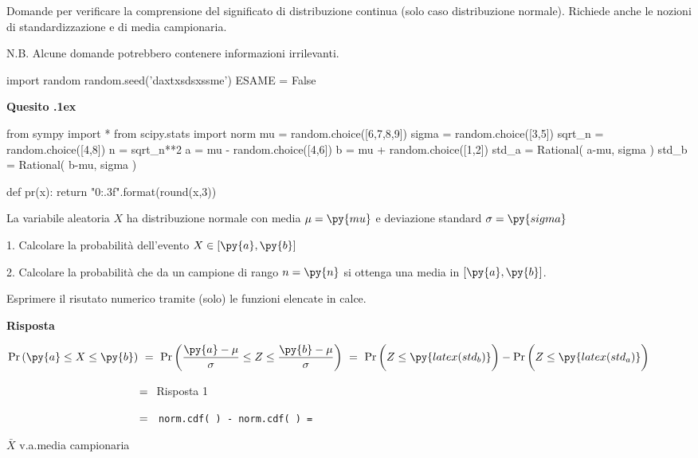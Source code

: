 \documentclass[11pt,twoside,a4paper]{article}
\def\Pr{{\rm Pr\,}}
\newcounter{quesito}
\newenvironment{question}{\addtocounter{quesito}{1}\bigskip\bigskip\par\textbf{Quesito \thequesito.\kern1ex}}{\vspace{\parskip}}
\newenvironment{answer}{\par\textbf{Risposta\quad}}{\vspace{\parskip}}
\begin{document}
\colorbox{blue!10}{\begin{minipage}{\textwidth}
Domande per verificare la comprensione del significato di distribuzione continua (solo caso distribuzione normale). Richiede anche le nozioni di standardizzazione e di media campionaria.\medskip

N.B. Alcune domande potrebbero contenere informazioni irrilevanti.
\end{minipage}}
\bigskip\bigskip


\begin{pycode}
import random
random.seed('daxtxsdsxssme')
ESAME = False
\end{pycode}

\begin{question} %
\begin{pycode}
from sympy import *
from scipy.stats import norm
mu = random.choice([6,7,8,9])
sigma = random.choice([3,5])
sqrt_n = random.choice([4,8])
n = sqrt_n**2
a = mu - random.choice([4,6])
b = mu + random.choice([1,2])
std_a = Rational( a-mu, sigma )
std_b = Rational( b-mu, sigma )

def pr(x):
    return "{0:.3f}".format(round(x,3))
\end{pycode}
La variabile aleatoria $X$ ha distribuzione normale con media $\mu=\py{mu}$ e deviazione standard $\sigma=\py{sigma}$ 

1. Calcolare la probabilità dell'evento $X\in [\py{a},\py{b}]$ 

2. Calcolare la probabilità che da un campione di rango $n=\py{n}$ si ottenga una media in $[\py{a},\py{b}]$. 

Esprimere il risutato numerico tramite (solo) le funzioni elencate in calce.
\begin{answer}


$\displaystyle \Pr(\py{a}\le X\le\py{b})
\ =\ 
\Pr\bigg(\dfrac{\py{a}-\mu}{\sigma}\le Z\le\dfrac{\py{b}-\mu}{\sigma}\bigg)
\ =\  
\Pr\bigg(Z\le\py{latex(std_b)}\bigg) -  \Pr\bigg(Z\le\py{latex(std_a)}\bigg)$ 

$\phantom{\Pr\py{a}\le X\le\py{b})}
\ =\ 
${ 
\hfill Risposta 1}

$\phantom{\Pr\py{a}\le X\le\py{b})}
\ =\ 
${\tt\ norm.cdf(  ) -  norm.cdf(  )
= 
}

$\bar X$ v.a.\@ media campionaria


\end{answer}
\end{question}
\end{document}
